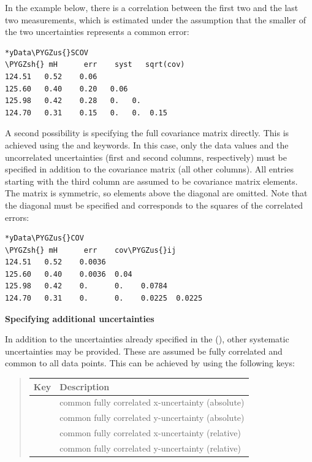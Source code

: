 \documentclass[a4paper,10pt,english]{sphinxmanual}
\def\PYGZus{\char`\_}
\def\PYGZsh{\char`\#}
\begin{document}
\begin{fulllineitems}
In the example below, there is a correlation between the first two and
the last two measurements, which is estimated under the assumption that
the smaller of the two uncertainties represents a common error:

\begin{Verbatim}[commandchars=\\\{\}]
*yData\PYGZus{}SCOV
\PYGZsh{} mH      err    syst   sqrt(cov)
124.51   0.52    0.06
125.60   0.40    0.20   0.06
125.98   0.42    0.28   0.   0.
124.70   0.31    0.15   0.   0.  0.15
\end{Verbatim}

A second possibility is specifying the full covariance matrix directly.
This is achieved using the  and  keywords.
In this case, only the data values and the uncorrelated uncertainties
(first and second columns, respectively) must be specified in addition
to the covariance matrix (all other columns). All entries starting with
the third column are assumed to be covariance matrix elements. The
matrix is symmetric, so elements above the diagonal are omitted. Note
that the diagonal must be specified and corresponds to the squares of
the correlated errors:

\begin{Verbatim}[commandchars=\\\{\}]
*yData\PYGZus{}COV
\PYGZsh{} mH      err    cov\PYGZus{}ij
124.51   0.52    0.0036
125.60   0.40    0.0036  0.04
125.98   0.42    0.      0.    0.0784
124.70   0.31    0.      0.    0.0225  0.0225
\end{Verbatim}

\textbf{Specifying additional uncertainties}

In addition to the uncertainties already specified in the
{\hyperref[module_doc:specifying-input-data]{\emph{}}} (), other systematic
uncertainties may be provided. These are assumed be fully correlated and
common to all data points. This can be achieved by using the following
keys:
\begin{quote}

\begin{tabulary}{\linewidth}{|L|L|}
\hline
\textsf{\relax 
\textbf{Key}
} & \textsf{\relax 
\textbf{Description}
}\\
\hline
{}
 & 
common fully correlated x-uncertainty (absolute)
\\
\hline
{}
 & 
common fully correlated y-uncertainty (absolute)
\\
\hline
{}
 & 
common fully correlated x-uncertainty (relative)
\\
\hline
{}
 & 
common fully correlated y-uncertainty (relative)
\\
\hline\end{tabulary}


\end{quote}
\end{fulllineitems}
\end{document}
